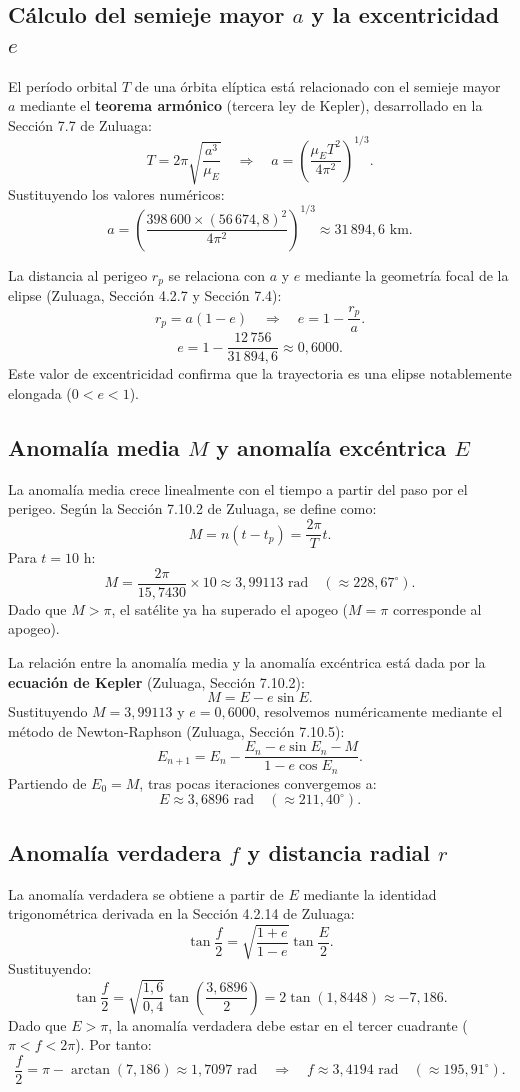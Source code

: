 \documentclass[12pt, a4paper]{article}
\begin{document}
\subsection*{Cálculo del semieje mayor $a$ y la excentricidad $e$}
El período orbital $T$ de una órbita elíptica está relacionado con el semieje mayor $a$ mediante el \textbf{teorema armónico} (tercera ley de Kepler), desarrollado en la Sección 7.7 de Zuluaga:
$$ T = 2\pi \sqrt{\frac{a^3}{\mu_E}} \quad \Longrightarrow \quad a = \left( \frac{\mu_E T^2}{4\pi^2} \right)^{1/3}. $$
Sustituyendo los valores numéricos:
$$ a = \left( \frac{398\,600 \times (56\,674,8)^2}{4\pi^2} \right)^{1/3} \approx 31\,894,6 \text{ km}. $$

La distancia al perigeo $r_p$ se relaciona con $a$ y $e$ mediante la geometría focal de la elipse (Zuluaga, Sección 4.2.7 y Sección 7.4):
$$ r_p = a(1 - e) \quad \Longrightarrow \quad e = 1 - \frac{r_p}{a}. $$
$$ e = 1 - \frac{12\,756}{31\,894,6} \approx 0,6000. $$
Este valor de excentricidad confirma que la trayectoria es una elipse notablemente elongada ($0 < e < 1$).

\subsection*{Anomalía media $M$ y anomalía excéntrica $E$}
La anomalía media crece linealmente con el tiempo a partir del paso por el perigeo. Según la Sección 7.10.2 de Zuluaga, se define como:
$$ M = n(t - t_p) = \frac{2\pi}{T} t. $$
Para $t = 10$ h:
$$ M = \frac{2\pi}{15,7430} \times 10 \approx 3,99113 \text{ rad} \quad (\approx 228,67^\circ). $$
Dado que $M > \pi$, el satélite ya ha superado el apogeo ($M = \pi$ corresponde al apogeo).

La relación entre la anomalía media y la anomalía excéntrica está dada por la \textbf{ecuación de Kepler} (Zuluaga, Sección 7.10.2):
$$ M = E - e \sin E. $$
Sustituyendo $M = 3,99113$ y $e = 0,6000$, resolvemos numéricamente mediante el método de Newton-Raphson (Zuluaga, Sección 7.10.5):
$$ E_{n+1} = E_n - \frac{E_n - e\sin E_n - M}{1 - e\cos E_n}. $$
Partiendo de $E_0 = M$, tras pocas iteraciones convergemos a:
$$ E \approx 3,6896 \text{ rad} \quad (\approx 211,40^\circ). $$

\subsection*{Anomalía verdadera $f$ y distancia radial $r$}
La anomalía verdadera se obtiene a partir de $E$ mediante la identidad trigonométrica derivada en la Sección 4.2.14 de Zuluaga:
$$ \tan\frac{f}{2} = \sqrt{\frac{1+e}{1-e}} \tan\frac{E}{2}. $$
Sustituyendo:
$$ \tan\frac{f}{2} = \sqrt{\frac{1,6}{0,4}} \tan\left(\frac{3,6896}{2}\right) = 2 \tan(1,8448) \approx -7,186. $$
Dado que $E > \pi$, la anomalía verdadera debe estar en el tercer cuadrante ($\pi < f < 2\pi$). Por tanto:
$$ \frac{f}{2} = \pi - \arctan(7,186) \approx 1,7097 \text{ rad} \quad \Longrightarrow \quad f \approx 3,4194 \text{ rad} \quad (\approx 195,91^\circ). $$
\end{document}
